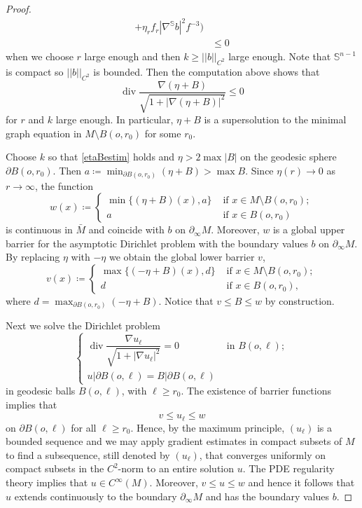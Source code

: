 \documentclass[10pt,a4paper,reqno]{amsart}
\newcommand{\Ss}{\mathbb{S}}
\newcommand{\p}{\partial}
\DeclareMathOperator\dv{div}
\newcommand{\pinf}{\partial_{\infty}}
\numberwithin{equation}{section}
\theoremstyle{plain}
\theoremstyle{definition}
\begin{document}
\begin{proof}
\begin{align}
            + \eta_r f_r |\nabla^{\Ss}b|^2f^{-3}  \bigg)   \nonumber
        \\
        &\le 0\nonumber
\end{align} 
when we choose $r$ large enough and then $k \ge ||b||_{C^2}$ large enough.
Note that $\Ss^{n-1}$ is compact so $||b||_{C^2}$ is bounded.
Then the computation above shows that
        \begin{equation*}
        \dv \frac{\nabla(\eta+ B)}{\sqrt{1+|\nabla(\eta+B)|^2}} \le 0
        \end{equation*}
for $r$ and $k$ large enough. In particular, $\eta + B$ is a supersolution to the minimal graph
equation in $M\setminus B(o,r_0)$ for some $r_0$.
       
Choose $k$ so that \eqref{etaBestim} holds and $\eta  > 2 \max |B|$ on the geodesic sphere $\p B(o,r_0)$.
Then  
$a \coloneqq \min_{\p B(o,r_0)} (\eta +  B) >  \max B$.
Since $\eta(r)\to 0$ as $r\to\infty$, the function 
        \[
                w(x) \coloneqq \begin{cases}
                        \min\{(\eta +  B)(x) , a \} &\text{ if } x\in M \setminus B(o,r_0); \\
                        a &\text{ if } x\in B(o,r_0)
                \end{cases}
        \]
is continuous in $\bar{M}$ and coincide with $b$ on $\pinf M$. Moreover, $w$ is a global upper barrier 
for the asymptotic Dirichlet problem with the boundary values $b$ on $\pinf M$.
By replacing $\eta$ with $-\eta$ we obtain the global lower barrier $v$,
\[
v(x) \coloneqq \begin{cases}
                        \max\{(-\eta +  B)(x) , d \} &\text{ if } x\in M \setminus B(o,r_0); \\
                        d &\text{ if } x\in B(o,r_0),
                \end{cases}
\]
where $d=\max_{\p B(o,r_0)} (-\eta +  B)$. Notice that $v\le B\le w$ by construction. 

Next we solve the Dirichlet problem
        \[
                \begin{cases}
                \dv \dfrac{\nabla u_\ell}{\sqrt{1+|\nabla u_\ell|^2}} = 0 &\text{ in } B(o,\ell); \\
                u|\p B(o,\ell) = B| \p B(o,\ell)
                \end{cases}
        \]
in geodesic balls $B(o,\ell)$, with $\ell\ge r_0$. The existence of barrier functions implies that
        \[
          v \le u_\ell \le w
        \]
on $\p B(o,\ell)$ for all $\ell \ge r_0$.        
Hence, by the maximum principle, $(u_\ell)$ is a bounded sequence and we may apply gradient estimates in compact
subsets of $M$ to find a subsequence,
still denoted by $(u_\ell)$, that converges uniformly on compact subsets in the $C^2$-norm to an entire solution $u$.
The PDE regularity theory implies that $u\in C^\infty(M)$. Moreover,
$v \le u \le w$ and hence it follows that $u$ extends continuously to the boundary $\pinf M$ and has the
boundary values $b$.
    

\end{proof}
\end{document}
